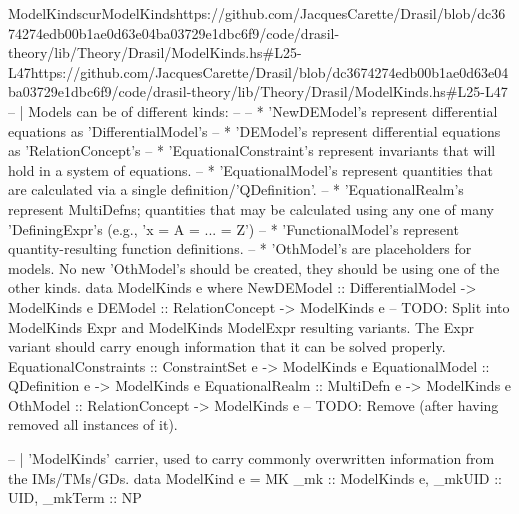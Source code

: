 \begin{haskell}{ModelKinds}{curModelKinds}{https://github.com/JacquesCarette/Drasil/blob/dc3674274edb00b1ae0d63e04ba03729e1dbc\newline{}6f9/code/drasil-theory/lib/Theory/Drasil/ModelKinds.hs\#L25-L47}{https://github.com/JacquesCarette/Drasil/blob/dc3674274edb00b1ae0d63e04ba03729e1dbc6f9/code/drasil-theory/lib/Theory/Drasil/ModelKinds.hs\#L25-L47}
-- | Models can be of different kinds: 
--
--     * 'NewDEModel's represent differential equations as 'DifferentialModel's
--     * 'DEModel's represent differential equations as 'RelationConcept's
--     * 'EquationalConstraint's represent invariants that will hold in a system of equations.
--     * 'EquationalModel's represent quantities that are calculated via a single definition/'QDefinition'.
--     * 'EquationalRealm's represent MultiDefns; quantities that may be calculated using any one of many 'DefiningExpr's (e.g., 'x = A = ... = Z')
--     * 'FunctionalModel's represent quantity-resulting function definitions.
--     * 'OthModel's are placeholders for models. No new 'OthModel's should be created, they should be using one of the other kinds.
data ModelKinds e where
  NewDEModel            :: DifferentialModel -> ModelKinds e
  DEModel               :: RelationConcept   -> ModelKinds e -- TODO: Split into ModelKinds Expr and ModelKinds ModelExpr resulting variants. The Expr variant should carry enough information that it can be solved properly.
  EquationalConstraints :: ConstraintSet e   -> ModelKinds e
  EquationalModel       :: QDefinition e     -> ModelKinds e
  EquationalRealm       :: MultiDefn e       -> ModelKinds e
  OthModel              :: RelationConcept   -> ModelKinds e -- TODO: Remove (after having removed all instances of it).


-- | 'ModelKinds' carrier, used to carry commonly overwritten information from the IMs/TMs/GDs.
data ModelKind e = MK {
  _mk     :: ModelKinds e,
  _mkUID  :: UID,
  _mkTerm :: NP
}
\end{haskell}

